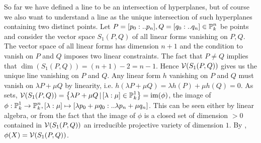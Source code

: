 So far we have defined a line to be an intersection of hyperplanes, but of course we also want to understand a line as the unique intersection of such hyperplanes containing two distinct points.
Let $P = [p_0:..p_n],Q=[q_0:..q_n] \in \operatorname{\mathbb P}^n_k$ be points and consider the vector space $S_1(P,Q)$ of all linear forms vanishing on $P,Q$.
The vector space of all linear forms has dimension $n+1$ and the condition to vanish on $P$ and $Q$ imposes two linear constraints.
The fact that $P\neq Q$ implies that $\dim(S_1(P,Q)) = (n+1) - 2 = n-1$.
Hence $\operatorname{\mathcal V}(S_1(P,Q))$ gives us the unique line vanishing on $P$ and $Q$.
Any linear form $h$ vanishing on $P$ and $Q$ must vanish on $\lambda P + \mu Q$ by linearity, i.e. $h(\lambda P + \mu Q) = \lambda h(P) + \mu h(Q) = 0$.
As sets, $\operatorname{\mathcal V}(S_1(P,Q)) = \left\lbrace\lambda P + \mu Q\,|\, [\lambda:\mu] \in \operatorname{\mathbb P}^1_k\right\rbrace = {\operatorname{im}}(\phi)$, the image of $\phi : \operatorname{\mathbb P}^1_k \to \operatorname{\mathbb P}^n_k, [\lambda:\mu] \mapsto [\lambda p_0+ \mu q_0:..\lambda p_n + \mu q_n]$.
This can be seen either by linear algebra, or from the fact that the image of $\phi$ is a closed set \cite[theorem 1.10]{shafarevich1994basic} of dimension $> 0$ contained in $\operatorname{\mathcal V}(S_1(P,Q))$ an irreducible projective variety of dimension $1$.
By \cite[theorem 1.19]{shafarevich1994basic}, $\phi(X) = \operatorname{\mathcal V}(S_1(P,Q))$.



